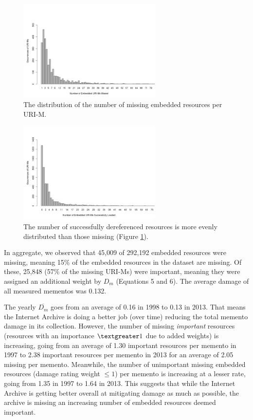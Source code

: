 \begin{figure}[h!]
\includegraphics[width=270px]{./imgs/occStats.png}
\caption{The distribution of the number of missing embedded resources per URI-M.}
\label{missingDistro}
\end{figure}

\begin{figure}[h!]
\includegraphics[width=270px]{./imgs/occStatsFound.png}
\caption{The number of successfully dereferenced resources is more evenly distributed than those missing (Figure \ref{missingDistro}).}
\label{foundDistro}
\end{figure}



In aggregate, we observed that 45,009 of 292,192 embedded resources were missing, meaning 15\% of the embedded resources in the dataset are missing. Of these, 25,848  (57\% of the missing URI-Ms) were important, meaning they were assigned an additional weight by $D_m$ (Equations 5 and 6). The average damage of all measured mementos was 0.132.

The yearly $\overline{D_m}$ goes from an average of 0.16 in 1998 to 0.13 in 2013. That means the Internet Archive is doing a better job (over time) reducing the total memento damage in its collection. However, the number of missing \emph{important} resources (resources with an importance $\textgreater 1$ due to added weights) is increasing, going from an average of 1.30 important resources per memento in 1997 to 2.38 important resources per memento in 2013 for an average of 2.05 missing per memento. Meanwhile, the number of unimportant missing embedded resources (damage rating weight $\leq 1$) per memento is increasing at a lesser rate, going from 1.35 in 1997 to 1.64 in 2013. This suggests that while the Internet Archive is getting better overall at mitigating damage as much as possible, the archive is missing an increasing number of embedded resources deemed important. 

